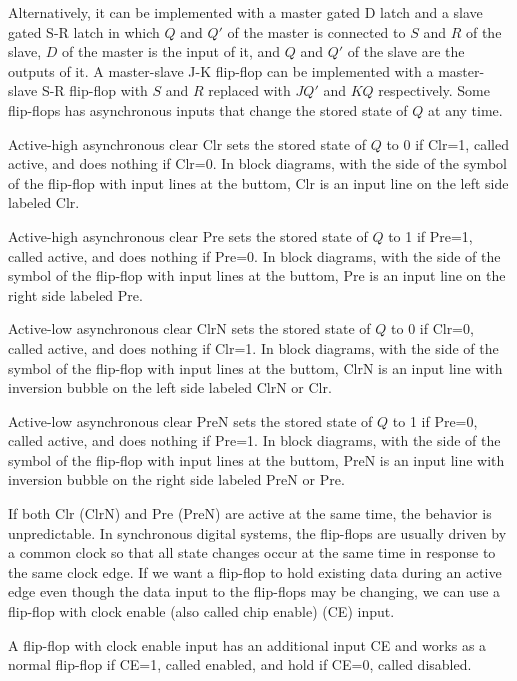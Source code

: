 \documentclass[a4paper,12pt]{report}
\begin{document}
Alternatively, it can be implemented with a master gated D latch and a slave gated S-R latch in which $Q$ and $Q'$ of the master is connected to $S$ and $R$ of the slave, $D$ of the master is the input of it, and $Q$ and $Q'$ of the slave are the outputs of it.
A master-slave J-K flip-flop can be implemented with a master-slave S-R flip-flop with $S$ and $R$ replaced with $JQ'$ and $KQ$ respectively.
Some flip-flops has asynchronous inputs that change the stored state of $Q$ at any time.
\bit
\item Active-high asynchronous clear Clr sets the stored state of $Q$ to 0 if Clr=1, called active, and does nothing if Clr=0. In block diagrams, with the side of the symbol of the flip-flop with input lines at the buttom, Clr is an input line on the left side labeled Clr.
\item Active-high asynchronous clear Pre sets the stored state of $Q$ to 1 if Pre=1, called active, and does nothing if Pre=0. In block diagrams, with the side of the symbol of the flip-flop with input lines at the buttom, Pre is an input line on the right side labeled Pre.
\item Active-low asynchronous clear ClrN sets the stored state of $Q$ to 0 if Clr=0, called active, and does nothing if Clr=1. In block diagrams, with the side of the symbol of the flip-flop with input lines at the buttom, ClrN is an input line with inversion bubble on the left side labeled ClrN or Clr.
\item Active-low asynchronous clear PreN sets the stored state of $Q$ to 1 if Pre=0, called active, and does nothing if Pre=1. In block diagrams, with the side of the symbol of the flip-flop with input lines at the buttom, PreN is an input line with inversion bubble on the right side labeled PreN or Pre.
\item If both Clr (ClrN) and Pre (PreN) are active at the same time, the behavior is unpredictable.
\eit
{}
In synchronous digital systems, the flip-flops are usually driven by a common clock so that all state changes occur at the same time in response to the same clock edge. If we want a flip-flop to hold existing data during an active edge even though the data input to the flip-flops may be changing, we can use a flip-flop with clock enable (also called chip enable) (CE) input.

A flip-flop with clock enable input has an additional input CE and works as a normal flip-flop if CE=1, called enabled, and hold if CE=0, called disabled.
\end{document}
